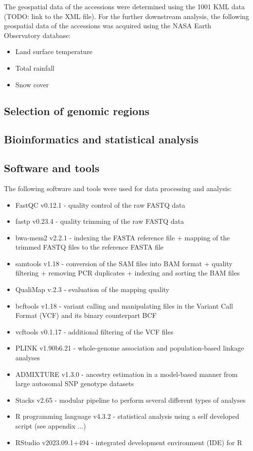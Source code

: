 The geospatial data of the accessions were determined using the 1001 KML data (TODO: link to the XML file). For the further downstream analysis, the following geospatial data of the accessions was acquired using the NASA Earth Observatory database:
\begin{itemize}
    \item Land surface temperature
    \item Total rainfall
    \item Snow cover
\end{itemize}

\subsection{Selection of genomic regions}

\subsection{Bioinformatics and statistical analysis}

\subsection{Software and tools}

The following software and tools were used for data processing and analysis:
\begin{itemize}
    \item FastQC v0.12.1 - quality control of the raw FASTQ data
    \item fastp v0.23.4 - quality trimming of the raw FASTQ data
    \item bwa-mem2 v2.2.1 - indexing the FASTA reference file + mapping of the trimmed FASTQ files to the reference FASTA file
    \item samtools v1.18 - conversion of the SAM files into BAM format + quality filtering + removing PCR duplicates + indexing and sorting the BAM files
    \item QualiMap v.2.3 - evaluation of the mapping quality
    \item bcftools v1.18 - variant calling and manipulating files in the Variant Call Format (VCF) and its binary counterpart BCF
    \item vcftools v0.1.17 - additional filtering of the VCF files
    \item PLINK v1.90b6.21 - whole-genome association and population-based linkage analyses
    \item ADMIXTURE v1.3.0 - ancestry estimation in a model-based manner from large autosomal SNP genotype datasets
    \item Stacks v2.65 - modular pipeline to perform several different types of analyses
    \item R programming language v4.3.2 - statistical analysis using a self developed script (see appendix ...)
    \item RStudio v2023.09.1+494 - integrated development environment (IDE) for R
\end{itemize}

